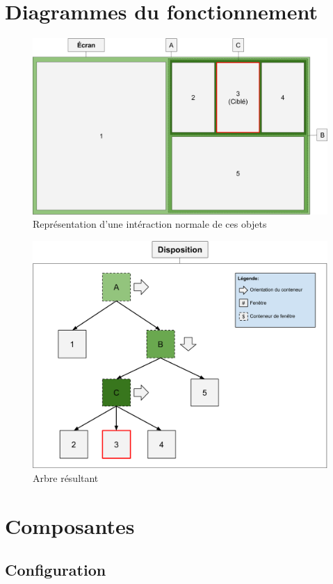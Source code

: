 \documentclass[titlepage]{article}
\begin{document}
\section{Diagrammes du fonctionnement}
\begin{figure}[H]
	\centering
	\includegraphics[width=\textwidth]{diagramme_du_fonctionnement.png}
	\caption{Représentation d'une intéraction normale de ces objets}
\end{figure}
\begin{figure}[H]
	\centering
	\includegraphics[width=\textwidth]{diagramme_du_fonctionnement_arbre.png}
	\caption{Arbre résultant}
\end{figure}
\section{Composantes}
\subsection{Configuration}
\end{document}
